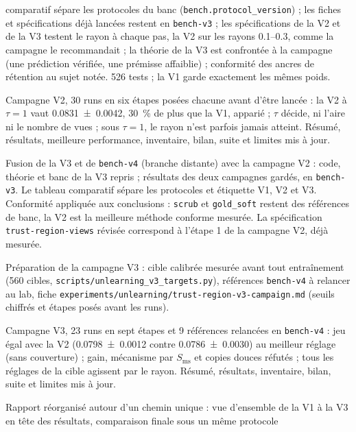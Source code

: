 \documentclass[11pt,a4paper]{article}
\newcommand{\code}[1]{\texttt{#1}}
\newcommand{\chemin}[1]{\nolinkurl{#1}}%
\begin{document}
\begin{description}[leftmargin=1.2em,font=\sffamily\bfseries\color{bleu}]
    comparatif sépare les protocoles du banc (\code{bench.protocol\_version}) ; les fiches et
    spécifications déjà lancées restent en \code{bench-v3} ; les spécifications de la V2 et de la V3
    testent le rayon à chaque pas, la V2 sur les rayons \numrange{0.1}{0.3}, comme la campagne le
    recommandait ; la théorie de la V3 est confrontée à la campagne (une prédiction vérifiée, une
    prémisse affaiblie) ; conformité des ancres de rétention au sujet notée. 526 tests ; la V1 garde
    exactement les mêmes poids.
  \item[21 novembre 2026, nuit, bilan V2] Campagne V2, 30 runs en six étapes posées chacune avant
    d'être lancée : la V2 à $\tau=1$ vaut \num{0.0831 +- 0.0042}, \SI{30}{\percent} de plus que la V1,
    apparié ; $\tau$ décide, ni l'aire ni le nombre de vues ; sous $\tau=1$, le rayon n'est parfois
    jamais atteint. Résumé, résultats, meilleure performance, inventaire, bilan, suite et limites
    mis à jour.
  \item[22 novembre 2026, troisième fusion] Fusion de la V3 et de \code{bench-v4} (branche
    distante) avec la campagne V2 : code, théorie et banc de la V3 repris ; résultats des deux
    campagnes gardés, en \code{bench-v3}. Le tableau comparatif sépare les protocoles et étiquette
    V1, V2 et V3. Conformité appliquée aux conclusions : \code{scrub} et \code{gold\_soft} restent des
    références de banc, la V2 est la meilleure méthode conforme mesurée. La spécification
    \code{trust-region-views} révisée correspond à l'étape 1 de la campagne V2, déjà mesurée.
  \item[22 novembre 2026, campagne V3] Préparation de la campagne V3 : cible calibrée mesurée avant
    tout entraînement (560 cibles, \chemin{scripts/unlearning\_v3\_targets.py}), références
    \code{bench-v4} à relancer au lab, fiche \chemin{experiments/unlearning/trust-region-v3-campaign.md}
    (seuils chiffrés et étapes posés avant les runs).
  \item[22 novembre 2026, bilan V3] Campagne V3, 23 runs en sept étapes et 9 références relancées
    en \code{bench-v4} : jeu égal avec la V2 (\num{0.0798 +- 0.0012} contre \num{0.0786 +- 0.0030}) au
    meilleur réglage (sans couverture) ; gain, mécanisme par $S_{\text{ms}}$ et copies douces
    réfutés ; tous les réglages de la cible agissent par le rayon. Résumé, résultats, inventaire,
    bilan, suite et limites mis à jour.
  \item[22 novembre 2026, synthèse] Rapport réorganisé autour d'un chemin unique : vue d'ensemble
    de la V1 à la V3 en tête des résultats, comparaison finale sous un même protocole

\end{description}
\end{document}

